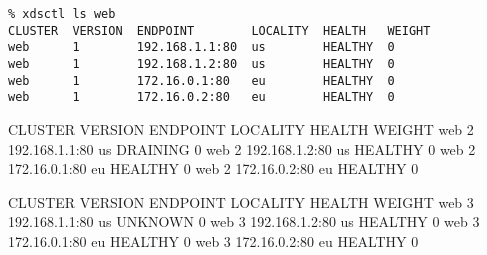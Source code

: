 \documentclass[aspectratio=169]{beamer}
\begin{document}
    \begin{frame}[fragile]
        \begin{verbatim}
% xdsctl ls web
CLUSTER  VERSION  ENDPOINT        LOCALITY  HEALTH   WEIGHT
web      1        192.168.1.1:80  us        HEALTHY  0
web      1        192.168.1.2:80  us        HEALTHY  0
web      1        172.16.0.1:80   eu        HEALTHY  0
web      1        172.16.0.2:80   eu        HEALTHY  0
        \end{verbatim}

    \end{frame}

    \begin{frame}[fragile]

        \begin{verbbox}
CLUSTER  VERSION  ENDPOINT        LOCALITY  HEALTH    WEIGHT
web      2        192.168.1.1:80  us        DRAINING  0
web      2        192.168.1.2:80  us        HEALTHY   0
web      2        172.16.0.1:80   eu        HEALTHY   0
web      2        172.16.0.2:80   eu        HEALTHY   0
        \end{verbbox}

    \end{frame}

    \begin{frame}[fragile]

        \begin{verbbox}
CLUSTER  VERSION  ENDPOINT        LOCALITY  HEALTH   WEIGHT
web      3        192.168.1.1:80  us        UNKNOWN  0
web      3        192.168.1.2:80  us        HEALTHY  0
web      3        172.16.0.1:80   eu        HEALTHY  0
web      3        172.16.0.2:80   eu        HEALTHY  0
        \end{verbbox}

    \end{frame}
\end{document}
